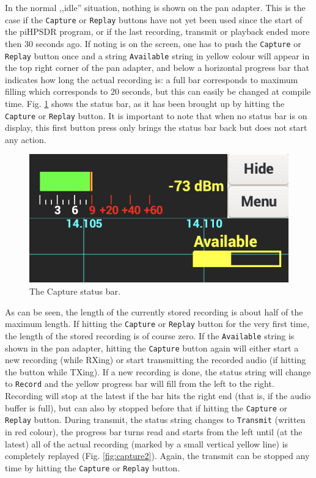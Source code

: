 \documentclass[12pt]{book}
\def\rett#1{\texttt{\color{red}#1}}
\def\bltt#1{\texttt{\color{blue}#1}}
\def\pH{pi\-HPSDR\xspace}
\begin{document}
In the normal ,,idle'' situation, nothing is shown on the pan adapter. This is the case if the \bltt{Capture}
or \bltt{Replay} buttons have not yet been used since the start of the \pH program,
 or if the last recording, transmit or playback ended
more then 30 seconds ago. If noting is on the screen, one has to push the \bltt{Capture} 
or \bltt{Replay} button once and
a string \rett{Available} string in yellow colour will appear in the top right corner of the pan adapter,
and below a horizontal progress bar that indicates how long the actual recording is: a full bar corresponds
to maximum filling which corresponds to 20 seconds, but this can easily be changed at compile time.
Fig. \ref{fig:capture1} shows the status bar, as it has been brought up by hitting the \bltt{Capture}
or \bltt{Replay} button.
It is important to note that when no status bar is on display, this first button press only brings
the status bar back but does not start any action.

\begin{figure}[ht]
\center
\includegraphics[scale=0.45]{Capture1.png}
\caption{The Capture status bar.}
\label{fig:capture1}
\end{figure}

As can be seen, the length of the currently stored recording is about half of the maximum length. If hitting
the \bltt{Capture} or \bltt{Replay} button for the very first time,
 the length of the stored recording is of course zero. If
the \rett{Available} string is shown in the pan adapter, hitting the \bltt{Capture} button again will either
start a new recording (while RXing) or start transmitting the recorded audio (if hitting the button while TXing).
If a new recording is done, the status string will change to \rett{Record} and the yellow progress bar
will fill from the left to the right. Recording will stop at the latest if the bar hits the right end
(that is, if the audio buffer is full), but can also by stopped before that if hitting the \bltt{Capture}
or \bltt{Replay}
button. During transmit, the status string changes to \rett{Transmit} (written in red colour), the progress bar
turns read and starts from the left until (at the latest) all of the actual recording (marked by a small
vertical yellow line) is completely replayed (Fig. \ref{fig:capture2}). Again, the transmit
can be stopped any time by hitting the \bltt{Capture} or \bltt{Replay} button.
\end{document}
